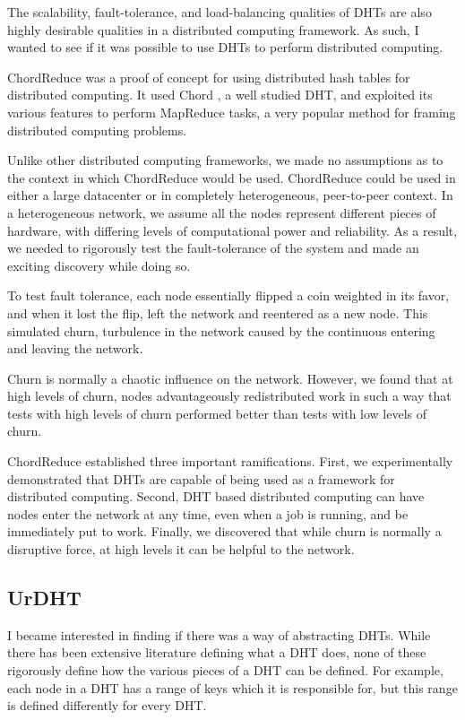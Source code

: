 \documentclass[letterpaper]{article}
\begin{document}
The scalability, fault-tolerance, and load-balancing qualities of DHTs are also highly desirable qualities in a distributed computing framework.
As such, I wanted to see if it was possible to use DHTs to perform distributed computing.

ChordReduce \cite{chordreduce} was a proof of concept for using distributed hash tables for distributed computing.  
It used Chord \cite{chord}, a well studied DHT, and exploited its various features to perform MapReduce \cite{mapreduce} tasks, a very popular method for framing distributed computing problems.

Unlike other distributed computing frameworks, we made no assumptions as to the context in which ChordReduce would be used.
ChordReduce could be used in either a large datacenter or in completely heterogeneous, peer-to-peer context.
In a heterogeneous network, we assume all the nodes represent different pieces of hardware, with differing levels of computational power and reliability.
As a result, we needed to rigorously test the fault-tolerance of the system and made an exciting discovery while doing so.

To test fault tolerance, each node essentially flipped a coin weighted in its favor, and when it lost the flip, left the network and reentered as a new node.
This simulated churn, turbulence in the network caused by the continuous entering and leaving the network.

Churn is normally a chaotic influence on the network. 
However, we found that at high levels of churn, nodes advantageously redistributed work in such a way that tests with high levels of churn performed better than tests with low levels of churn.

ChordReduce established three important ramifications.
First, we experimentally demonstrated that DHTs are capable of being used as a framework for distributed computing.
Second, DHT based distributed computing can have nodes enter the network at any time, even when a job is running, and be immediately put to work.
Finally, we discovered that while churn is normally a disruptive force, at high levels it can be helpful to the network.


\subsection{UrDHT}
I became interested in finding if there was a way of abstracting DHTs.
While there has been extensive literature defining what a DHT does, none of these rigorously define how the various pieces of a DHT can be defined.
For example, each node in a DHT has a range of keys which it is responsible for, but this range is defined differently for every DHT. 
\end{document}
